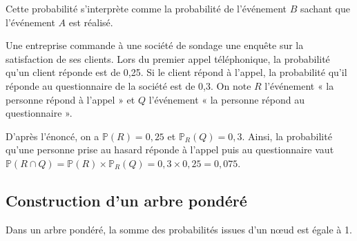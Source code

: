\documentclass[11pt,fleqn, openany]{book} %
\begin{document}
Cette probabilité s'interprète comme la probabilité de l'événement $B$ sachant que l'événement $A$ est réalisé.

\begin{example}Une entreprise commande à une société de sondage une enquête sur la satisfaction de ses clients. Lors du premier appel téléphonique, la probabilité qu'un client réponde est de 0,25. Si le client répond à l'appel, la probabilité qu'il réponde au questionnaire de la société est de 0,3. On note $R$ l'événement « la personne répond à l'appel » et $Q$ l'événement « la personne répond au questionnaire ». 

D'après l'énoncé, on a $\mathbb{P}(R)=0,25$ et $\mathbb{P}_R(Q)=0,3$. Ainsi, la probabilité qu'une personne prise au hasard réponde à l'appel puis au questionnaire vaut $\mathbb{P}(R \cap Q) = \mathbb{P}(R) \times \mathbb{P}_R(Q)=0,3 \times 0,25 = 0,075$.\end{example}

\newpage

\subsection{Construction d'un arbre pondéré}

\begin{proposition} Dans un arbre pondéré, la somme des probabilités issues d'un nœud est égale à 1.
\end{proposition}
\end{document}
